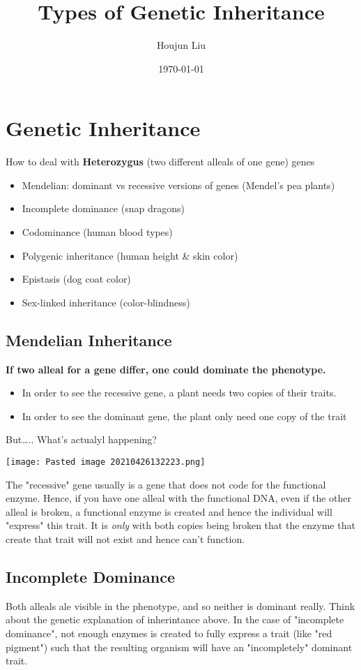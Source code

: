 \documentclass[letterpaper]{article}
\author{Houjun Liu}
\date{\today}
\title{Types of Genetic Inheritance}
\renewcommand{\tableofcontents}{}
\begin{document}
\tableofcontents



\section{Genetic Inheritance}
\label{sec:org243a098}
How to deal with \textbf{Heterozygus} (two different alleals of one gene) genes

\begin{itemize}
\item Mendelian: dominant vs recessive versions of genes (Mendel's pea
plants)
\item Incomplete dominance (snap dragons)
\item Codominance (human blood types)
\item Polygenic inheritance (human height \& skin color)
\item Epistasis (dog coat color)
\item Sex-linked inheritance (color-blindness)
\end{itemize}

\subsection{Mendelian Inheritance}
\label{sec:org5ac0470}
\textbf{If two alleal for a gene differ, one could dominate the phenotype.}

\begin{itemize}
\item In order to see the recessive gene, a plant needs two copies of their
traits.
\item In order to see the dominant gene, the plant only need one copy of the
trait
\end{itemize}

But\ldots{}.. What's actualyl happening?

\begin{center}
\texttt{[image: Pasted image 20210426132223.png]}
\end{center}

The "recessive" gene usually is a gene that does not code for the
functional enzyme. Hence, if you have one alleal with the functional
DNA, even if the other alleal is broken, a functional enzyme is created
and hence the individual will "express" this trait. It is \emph{only} with
both copies being broken that the enzyme that create that trait will not
exist and hence can't function.

\subsection{Incomplete Dominance}
\label{sec:org879a9c5}
Both alleals ale visible in the phenotype, and so neither is dominant
really. Think about the genetic explanation of inherintance above. In
the case of "incomplete dominance", not enough enzymes is created to
fully express a trait (like "red pigment") such that the resulting
organism will have an "incompletely" dominant trait.
\end{document}

